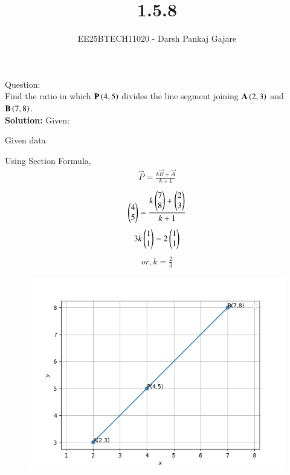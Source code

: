 \documentclass[journal,12pt,onecolumn]{IEEEtran}
\begin{document}
\title{1.5.8}
\author{EE25BTECH11020 - Darsh Pankaj Gajare}
{\let\newpage\relax\maketitle}
Question:\\
Find the ratio in which $\mathbf{P}\left(4, 5\right)$ divides the line segment joining $\mathbf{A}\left(2, 3\right)$ and $\mathbf{B}\left(7, 8\right)$.\\
\textbf{Solution:}
Given:
\begin{table}[H]
	\centering
	\label{}
	\caption{Given data}
	
\end{table}
Using Section Formula,\\
\begin{align}
\vec{P}=\frac{k\vec{B}+\vec{A}}{k+1}
\end{align}
\begin{align}
\begin{pmatrix}4\\5\end{pmatrix}=\frac{k\begin{pmatrix}7\\8\end{pmatrix}+\begin{pmatrix}2\\3\end{pmatrix}}{k+1}
\end{align}
\begin{align}
3k\begin{pmatrix}1\\1\end{pmatrix}=2\begin{pmatrix}1\\1\end{pmatrix}
\end{align}
\begin{align}
or, k=\frac{2}{3}
\end{align}
\begin{figure}[H]
	\centering
	\includegraphics[scale=0.5]{img}
	\caption*{}
	\label{img}
\end{figure}
\end{document}
